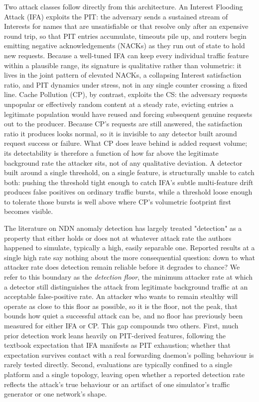 Two attack classes follow directly from this architecture. An Interest Flooding Attack (IFA) exploits the PIT: the adversary sends a sustained stream of Interests for names that are unsatisfiable or that resolve only after an expensive round trip, so that PIT entries accumulate, timeouts pile up, and routers begin emitting negative acknowledgements (NACKs) as they run out of state to hold new requests. Because a well-tuned IFA can keep every individual traffic feature within a plausible range, its signature is qualitative rather than volumetric: it lives in the joint pattern of elevated NACKs, a collapsing Interest satisfaction ratio, and PIT dynamics under stress, not in any single counter crossing a fixed line. Cache Pollution (CP), by contrast, exploits the CS: the adversary requests unpopular or effectively random content at a steady rate, evicting entries a legitimate population would have reused and forcing subsequent genuine requests out to the producer. Because CP's requests are still answered, the satisfaction ratio it produces looks normal, so it is invisible to any detector built around request success or failure. What CP does leave behind is added request volume; its detectability is therefore a function of how far above the legitimate background rate the attacker sits, not of any qualitative deviation. A detector built around a single threshold, on a single feature, is structurally unable to catch both: pushing the threshold tight enough to catch IFA's subtle multi-feature drift produces false positives on ordinary traffic bursts, while a threshold loose enough to tolerate those bursts is well above where CP's volumetric footprint first becomes visible.

The literature on NDN anomaly detection has largely treated "detection" as a property that either holds or does not at whatever attack rate the authors happened to simulate, typically a high, easily separable one. Reported results at a single high rate say nothing about the more consequential question: down to what attacker rate does detection remain reliable before it degrades to chance? We refer to this boundary as the \emph{detection floor}, the minimum attacker rate at which a detector still distinguishes the attack from legitimate background traffic at an acceptable false-positive rate. An attacker who wants to remain stealthy will operate as close to this floor as possible, so it is the floor, not the peak, that bounds how quiet a successful attack can be, and no floor has previously been measured for either IFA or CP. This gap compounds two others. First, much prior detection work leans heavily on PIT-derived features, following the textbook expectation that IFA manifests as PIT exhaustion; whether that expectation survives contact with a real forwarding daemon's polling behaviour is rarely tested directly. Second, evaluations are typically confined to a single platform and a single topology, leaving open whether a reported detection rate reflects the attack's true behaviour or an artifact of one simulator's traffic generator or one network's shape.

